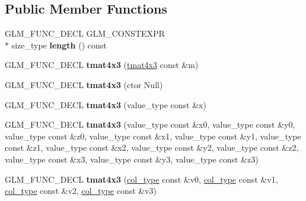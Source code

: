 \subsection*{Public Member Functions}
\begin{DoxyCompactItemize}
\item 
\hypertarget{structglm_1_1detail_1_1tmat4x3_a9f220f61dddf244b80b067fcbae1be73}{G\-L\-M\-\_\-\-F\-U\-N\-C\-\_\-\-D\-E\-C\-L G\-L\-M\-\_\-\-C\-O\-N\-S\-T\-E\-X\-P\-R \\*
size\-\_\-type {\bfseries length} () const }\label{structglm_1_1detail_1_1tmat4x3_a9f220f61dddf244b80b067fcbae1be73}

\item 
\hypertarget{structglm_1_1detail_1_1tmat4x3_a2bc29b38393bf401dd8f0bba108e57b6}{G\-L\-M\-\_\-\-F\-U\-N\-C\-\_\-\-D\-E\-C\-L {\bfseries tmat4x3} (\hyperlink{structglm_1_1detail_1_1tmat4x3}{tmat4x3} const \&m)}\label{structglm_1_1detail_1_1tmat4x3_a2bc29b38393bf401dd8f0bba108e57b6}

\item 
\hypertarget{structglm_1_1detail_1_1tmat4x3_a6b5a22077997944d553a2e29bb8bd93f}{G\-L\-M\-\_\-\-F\-U\-N\-C\-\_\-\-D\-E\-C\-L {\bfseries tmat4x3} (ctor Null)}\label{structglm_1_1detail_1_1tmat4x3_a6b5a22077997944d553a2e29bb8bd93f}

\item 
\hypertarget{structglm_1_1detail_1_1tmat4x3_a84ebf60e36ccc8664fbd5d3657ec657b}{G\-L\-M\-\_\-\-F\-U\-N\-C\-\_\-\-D\-E\-C\-L {\bfseries tmat4x3} (value\-\_\-type const \&x)}\label{structglm_1_1detail_1_1tmat4x3_a84ebf60e36ccc8664fbd5d3657ec657b}

\item 
\hypertarget{structglm_1_1detail_1_1tmat4x3_a2d3dad3e9daec3807c32453770702127}{G\-L\-M\-\_\-\-F\-U\-N\-C\-\_\-\-D\-E\-C\-L {\bfseries tmat4x3} (value\-\_\-type const \&x0, value\-\_\-type const \&y0, value\-\_\-type const \&z0, value\-\_\-type const \&x1, value\-\_\-type const \&y1, value\-\_\-type const \&z1, value\-\_\-type const \&x2, value\-\_\-type const \&y2, value\-\_\-type const \&z2, value\-\_\-type const \&x3, value\-\_\-type const \&y3, value\-\_\-type const \&z3)}\label{structglm_1_1detail_1_1tmat4x3_a2d3dad3e9daec3807c32453770702127}

\item 
\hypertarget{structglm_1_1detail_1_1tmat4x3_a594cd3ad59e0166887b7db9c6e1e2cd6}{G\-L\-M\-\_\-\-F\-U\-N\-C\-\_\-\-D\-E\-C\-L {\bfseries tmat4x3} (\hyperlink{structglm_1_1detail_1_1tvec3}{col\-\_\-type} const \&v0, \hyperlink{structglm_1_1detail_1_1tvec3}{col\-\_\-type} const \&v1, \hyperlink{structglm_1_1detail_1_1tvec3}{col\-\_\-type} const \&v2, \hyperlink{structglm_1_1detail_1_1tvec3}{col\-\_\-type} const \&v3)}\label{structglm_1_1detail_1_1tmat4x3_a594cd3ad59e0166887b7db9c6e1e2cd6}


\end{DoxyCompactItemize}
